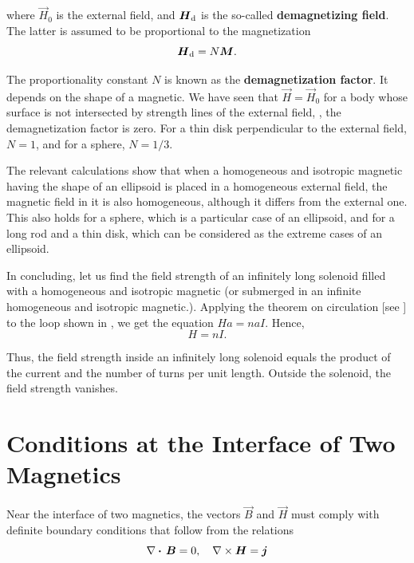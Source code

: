 \noindent
where $\vec{H}_0$ is the external field, and $\boldsymbol{H}_{\text{d}}$ is the so-called \textbf{demagnetizing field}.
The latter is assumed to be proportional to the magnetization
\begin{equation}\label{eq:7_28}
    \boldsymbol{H}_{\text{d}} = N \boldsymbol{M}.
\end{equation}

\noindent
The proportionality constant $N$ is known as the \textbf{demagnetization factor}.
It depends on the shape of a magnetic.
We have seen that $\vec{H} = \vec{H}_0$ for a body whose surface is not intersected by strength lines of the external field, \ie, the demagnetization factor is zero.
For a thin disk perpendicular to the external field, $N = 1$, and for a sphere, $N = 1/3$.

The relevant calculations show that when a homogeneous and isotropic magnetic having the shape of an ellipsoid is placed in a homogeneous external field, the magnetic field in it is also homogeneous, although it differs from the external one.
This also holds for a sphere, which is a particular case of an ellipsoid, and for a long rod and a thin disk, which can be considered as the extreme cases of an ellipsoid.

In concluding, let us find the field strength of an infinitely long solenoid filled with a homogeneous and isotropic magnetic (or submerged in an infinite homogeneous and isotropic magnetic.).
Applying the theorem on circulation [see ] to the loop shown in , we get the equation $Ha = naI$.
Hence,
\begin{equation}\label{eq:7_29}
    H = nI.
\end{equation}

\noindent
Thus, the field strength inside an infinitely long solenoid equals the product of the current and the number of turns per unit length.
Outside the solenoid, the field strength vanishes.

\section{Conditions at the Interface of Two Magnetics}\label{sec:7_4}

Near the interface of two magnetics, the vectors $\vec{B}$ and $\vec{H}$ must comply with definite boundary conditions that follow from the relations
\begin{equation}\label{eq:7_30}
    \nabla\boldsymbol{\cdot}\,\boldsymbol{B} = 0,\quad \nabla\times\boldsymbol{H} = \boldsymbol{j}
\end{equation}

